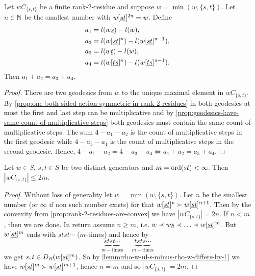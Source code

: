 \begin{prop}

	Let $wC_{\{s,t\}}$ be a finite rank-2-residue and suppose $w = \min(w,\{s,t\})$. Let $n \in \mathbb{N}$ be the smallest number with $w[\underline{s} \underline{t}]^{2n} = w$. Define
	\begin{align*}
		a_1 & = l(w \underline{s}) - l(w), \\
		a_2 & = l(w[\underline{s} \underline{t}]^{n}) - l(w[\underline{s} \underline{t}]^{n-1}), \\
		a_3 & = l(w \underline{t}) - l(w), \\
		a_4 & = l(w[\underline{t} \underline{s}]^{n}) - l(w[\underline{t} \underline{s}]^{n-1}).
	\end{align*}
	Then $a_1 + a_2 = a_3 + a_4$.

	\begin{proof}
		There are two geodesics from $w$ to the unique maximal element in $wC_{\{s,t\}}$. By \ref{prop:one-both-sided-action-symmetric-in-rank-2-residues} in both geodesics at most the first and last step can be multiplicative and by \ref{prop:geodesics-have-same-count-of-multiplicative-steps} both geodesics must contain the same count of multiplicative steps. The sum $4-a_1-a_2$ is the count of multiplicative steps in the first geodesic while $4-a_3-a_4$ is the count of multiplicative steps in the second geodesic. Hence, $4-a_1-a_2 = 4-a_3-a_4 \iff a_1+a_2 = a_3+a_4$.
	\end{proof}
\end{prop}

\begin{lemm}
	Let $w \in S$, $s,t \in S$ be two distinct generators and $m = \operatorname{ord}(st) < \infty$. Then $|wC_{\{s,t\}}| \leq 2m$.

	\begin{proof}
		Without loss of generality let $w = \min(w,\{s,t\})$. Let $n$ be the smallest number (or $\infty$ if non such number exists) for that $w[\underline{s} \underline{t}]^{n} \succ w[\underline{s} \underline{t}]^{n+1}$. Then by the convexity from \ref{prop:rank-2-residues-are-convex} we have $|wC_{\{s,t\}}| = 2n$. If $n < m$, then we are done. In return assume $n \geq m$, i.e. $w \prec w \underline{s} \prec \ldots \prec w[\underline{s} \underline{t}]^{m}$. But $w[\underline{s} \underline{t}]^{m}$ ends with $stst \cdots$ ($m$-times) and hence by
		$$ \underbrace{stst \cdots}_{m-\textrm{times}} = \underbrace{tsts \cdots}_{m-\textrm{times}} $$
		we get $s,t \in D_R(w[\underline{s} \underline{t}]^{m})$. So by \ref{lemm:rho-w-ul-s-minus-rho-w-differs-by-1} we have $w[\underline{s} \underline{t}]^{m} \succ w[\underline{s} \underline{t}]^{m+1}$, hence $n = m$ and so $|wC_{\{s,t\}}| = 2m$.
	\end{proof}
\end{lemm}


